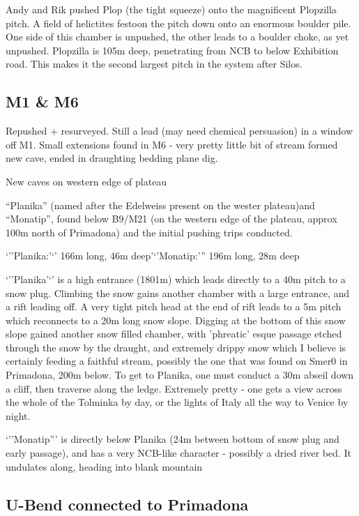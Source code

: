 Andy and Rik pushed Plop (the tight squeeze) onto the magnificent
Plopzilla pitch. A field of helictites festoon the pitch down onto an
enormous boulder pile. One side of this chamber is unpushed, the other
leads to a boulder choke, as yet unpushed. Plopzilla is 105m deep,
penetrating from NCB to below Exhibition road. This makes it the second
largest pitch in the system after Silos.

\subsection{M1 \& M6}\label{m1-m6}

Repushed + resurveyed. Still a lead (may need chemical persuasion) in a
window off M1. Small extensions found in M6 - very pretty little bit of
stream formed new cave, ended in draughting bedding plane dig.

New caves on western edge of plateau

``Planika'' (named after the Edelweiss present on the wester plateau)and
``Monatip'', found below B9/M21 (on the western edge of the plateau,
approx 100m north of Primadona) and the initial pushing trips conducted.

`''Planika:'`' 166m long, 46m deep'`'Monatip:''' 196m long, 28m deep

`''Planika'`' is a high entrance (1801m) which leads directly to a 40m
pitch to a snow plug. Climbing the snow gains another chamber with a
large entrance, and a rift leading off. A very tight pitch head at the
end of rift leads to a 5m pitch which reconnects to a 20m long snow
slope. Digging at the bottom of this snow slope gained another snow
filled chamber, with 'phreatic' esque passage etched through the snow by
the draught, and extremely drippy snow which I believe is certainly
feeding a faithful stream, possibly the one that was found on Smer0 in
Primadona, 200m below. To get to Planika, one must conduct a 30m abseil
down a cliff, then traverse along the ledge. Extremely pretty - one gets
a view across the whole of the Tolminka by day, or the lights of Italy
all the way to Venice by night.

`''Monatip''' is directly below Planika (24m between bottom of snow plug
and early passage), and has a very NCB-like character - possibly a dried
river bed. It undulates along, heading into blank mountain

\subsection{U-Bend connected to
Primadona}\label{u-bend-connected-to-primadona}


